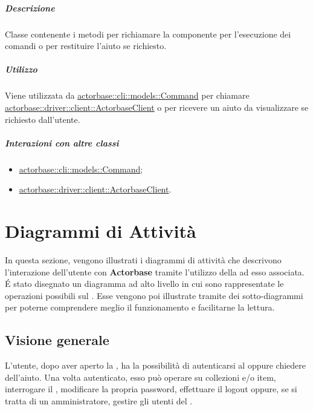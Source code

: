 \documentclass{scalatekids-article}
\begin{document}
\subparagraph{Descrizione}

Classe contenente i metodi per richiamare la componente  per
l'esecuzione dei comandi o per restituire l'aiuto se richiesto.

\subparagraph{Utilizzo}

Viene utilizzata da \hyperref[sec:actorbase::cli::models::Command]{actorbase::cli::models::Command} per chiamare
\hyperref[sec:actorbase::driver::client::ActorbaseClient]{actorbase::driver::client::ActorbaseClient} o per ricevere un aiuto da
visualizzare se richiesto dall'utente.

\subparagraph{Interazioni con altre classi}

\begin{itemize}
\item \hyperref[sec:actorbase::cli::models::Command]{actorbase::cli::models::Command};
\item \hyperref[sec:actorbase::driver::client::ActorbaseClient]{actorbase::driver::client::ActorbaseClient}.
\end{itemize}

\section{Diagrammi di Attività}

In questa sezione, vengono illustrati i diagrammi di attività che descrivono
l'interazione dell'utente con \textbf{Actorbase} tramite l'utilizzo della 
ad esso associata.  É stato disegnato un diagramma ad alto livello in cui sono
rappresentate le operazioni possibili sul . Esse vengono poi
illustrate tramite dei sotto-diagrammi per poterne comprendere meglio il
funzionamento e facilitarne la lettura.

\subsection{Visione generale}

L'utente, dopo aver aperto la , ha la possibilità di autenticarsi
al  oppure chiedere dell'aiuto. Una volta autenticato, esso può
operare su collezioni e/o item, interrogare il , modificare la propria
password, effettuare il logout oppure, se si tratta di un amministratore,
gestire gli utenti del .
\end{document}
